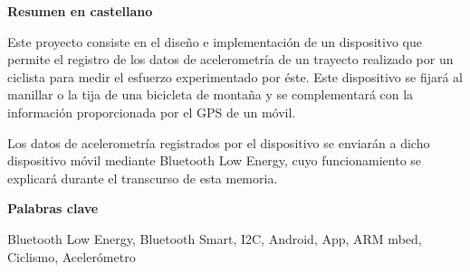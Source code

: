 
\newpage

\thispagestyle{empty}

\begin{center}

{\bf \Huge Resumen en castellano}

  \end{center}
\vspace{1cm}

Este proyecto consiste en el diseño e implementación de un dispositivo que permite el registro de los datos de acelerometría de un trayecto realizado por un ciclista para medir el esfuerzo experimentado por éste. Este dispositivo se fijará al manillar o la tija de una bicicleta de montaña y se complementará con la información proporcionada por el GPS de un móvil.

Los datos de acelerometría registrados por el dispositivo se enviarán a dicho dispositivo móvil mediante Bluetooth Low Energy, cuyo funcionamiento se explicará durante el transcurso de esta memoria.

\vspace{1cm}


\begin{center}

{\bf \Large Palabras clave}

   \end{center}

   \vspace{0.5cm}
   
   Bluetooth Low Energy, Bluetooth Smart, I2C, Android, App, ARM mbed, Ciclismo, Acelerómetro
   



